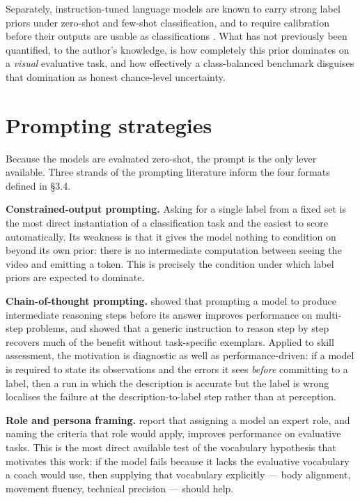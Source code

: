 \documentclass[logo,msc]{infthesis}
\newcommand{\runin}[1]{\par\medskip\noindent\textbf{#1}}
\begin{document}
Separately, instruction-tuned language models are known to carry strong
label priors under zero-shot and few-shot classification, and to require
calibration before their outputs are usable as classifications
\citep{zhao2021}. What has not previously been quantified, to the author's
knowledge, is how completely this prior dominates on a \emph{visual}
evaluative task, and how effectively a class-balanced benchmark disguises
that domination as honest chance-level uncertainty.

\section{Prompting strategies}

Because the models are evaluated zero-shot, the prompt is the only lever
available. Three strands of the prompting literature inform the four
formats defined in §3.4.

\runin{Constrained-output prompting.} Asking for a single label from a
fixed set is the most direct instantiation of a classification task and the
easiest to score automatically. Its weakness is that it gives the model
nothing to condition on beyond its own prior: there is no intermediate
computation between seeing the video and emitting a token. This is
precisely the condition under which label priors are expected to dominate.

\runin{Chain-of-thought prompting.} \citet{wei2022} showed that
prompting a model to produce intermediate reasoning steps before its answer
improves performance on multi-step problems, and \citet{kojima2022} showed
that a generic instruction to reason step by step recovers much of the
benefit without task-specific exemplars. Applied to skill assessment, the
motivation is diagnostic as well as performance-driven: if a model is
required to state its observations and the errors it sees \emph{before}
committing to a label, then a run in which the description is accurate but
the label is wrong localises the failure at the description-to-label step
rather than at perception.

\runin{Role and persona framing.} \citet{kong2024} report that
assigning a model an expert role, and naming the criteria that role would
apply, improves performance on evaluative tasks. This is the most direct
available test of the vocabulary hypothesis that motivates this work: if
the model fails because it lacks the evaluative vocabulary a coach would
use, then supplying that vocabulary explicitly --- body alignment, movement
fluency, technical precision --- should help.
\end{document}
